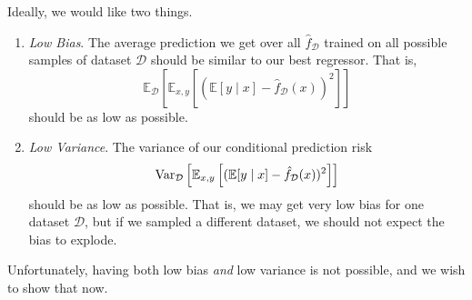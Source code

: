   Ideally, we would like two things. 
  \begin{enumerate}
    \item \textit{Low Bias}. The average prediction we get over all $\hat{f}_{\mathcal{D}}$ trained on all possible samples of dataset $\mathcal{D}$ should be similar to our best regressor. That is, 
    \begin{equation}
      \mathbb{E}_{\mathcal{D}} \left[ \mathbb{E}_{x, y} \left[ (\mathbb{E}[y \mid x] - \hat{f}_{\mathcal{D}}(x))^2 \right] \right]
    \end{equation}
    should be as low as possible. 

    \item \textit{Low Variance}. The variance of our conditional prediction risk  
    \begin{equation}
      \operatorname{Var}_{\mathcal{D}} \left[ \mathbb{E}_{x, y} \left[ (\mathbb{E}[y \mid x] - \hat{f}_{\mathcal{D}}(x))^2 \right] \right]
    \end{equation}
    should be as low as possible. That is, we may get very low bias for one dataset $\mathcal{D}$, but if we sampled a different dataset, we should not expect the bias to explode. 
  \end{enumerate}

  Unfortunately, having both low bias \textit{and} low variance is not possible, and we wish to show that now. 

